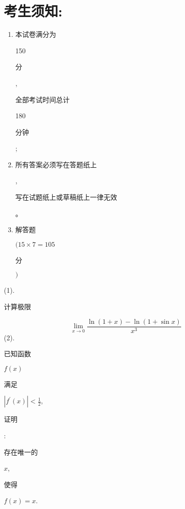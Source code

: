 \documentclass[10pt]{article}
\begin{document}
\section{考生须知:}
\begin{enumerate}
  \item \begin{CJK}{UTF8}{mj}本试卷满分为\end{CJK} 150 \begin{CJK}{UTF8}{mj}分\end{CJK}, \begin{CJK}{UTF8}{mj}全部考试时间总计\end{CJK} 180 \begin{CJK}{UTF8}{mj}分钟\end{CJK};

  \item \begin{CJK}{UTF8}{mj}所有答案必须写在答题纸上\end{CJK}, \begin{CJK}{UTF8}{mj}写在试题纸上或草稿纸上一律无效\end{CJK}。

  \item \begin{CJK}{UTF8}{mj}解答题\end{CJK} $(15 \times 7=105$ \begin{CJK}{UTF8}{mj}分\end{CJK} $)$

\end{enumerate}
(1). \begin{CJK}{UTF8}{mj}计算极限\end{CJK}
$$
\lim _{x \rightarrow 0} \frac{\ln (1+x)-\ln (1+\sin x)}{x^{3}}
$$
(2). \begin{CJK}{UTF8}{mj}已知函数\end{CJK} $f(x)$ \begin{CJK}{UTF8}{mj}满足\end{CJK} $\left|f^{\prime}(x)\right|<\frac{1}{2}$, \begin{CJK}{UTF8}{mj}证明\end{CJK}: \begin{CJK}{UTF8}{mj}存在唯一的\end{CJK} $x$, \begin{CJK}{UTF8}{mj}使得\end{CJK} $f(x)=x$.
\end{document}
